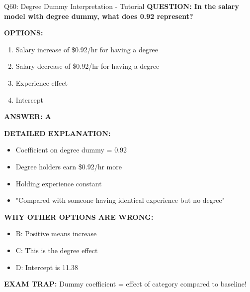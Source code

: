 \documentclass[8pt]{beamer}
\begin{document}
	\begin{frame}{Q60: Degree Dummy Interpretation - Tutorial}
		\fontsize{6.5}{7.5}\selectfont
		\textbf{QUESTION: In the salary model with degree dummy, what does 0.92 represent?}
		
		\vspace{0.1cm}
		\textbf{OPTIONS:}
		\begin{enumerate}
			\item Salary increase of \$0.92/hr for having a degree
			\item Salary decrease of \$0.92/hr for having a degree
			\item Experience effect
			\item Intercept
		\end{enumerate}
		
		\vspace{0.1cm}
		\textcolor{myblue}{\textbf{ANSWER: A}}
		
		\vspace{0.1cm}
		\textbf{DETAILED EXPLANATION:}
		\begin{itemize}
			\item Coefficient on degree dummy = 0.92
			\item Degree holders earn \$0.92/hr more
			\item Holding experience constant
			\item "Compared with someone having identical experience but no degree"
		\end{itemize}
		
		\vspace{0.1cm}
		\textcolor{myred}{\textbf{WHY OTHER OPTIONS ARE WRONG:}}
		\begin{itemize}
			\item \textcolor{myred}{B:} Positive means increase
			\item \textcolor{myred}{C:} This is the degree effect
			\item \textcolor{myred}{D:} Intercept is 11.38
		\end{itemize}
		
		\textcolor{myred}{\textbf{EXAM TRAP:}} Dummy coefficient = \textcolor{myblue}{effect of category} compared to baseline!
	\end{frame}
	
\end{document}
